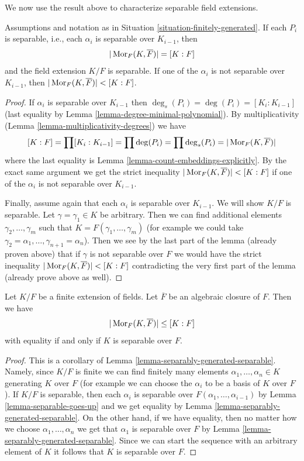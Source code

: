\noindent
We now use the result above to characterize separable field extensions.

\begin{lemma}
\label{lemma-separably-generated-separable}
Assumptions and notation as in Situation \ref{situation-finitely-generated}.
If each $P_i$ is separable, i.e., each $\alpha_i$ is separable over
$K_{i - 1}$, then
$$
|\mathop{\mathrm{Mor}}\nolimits_F(K, \overline{F})| = [K : F]
$$
and the field extension $K/F$ is separable. If one of the $\alpha_i$ is
not separable over $K_{i - 1}$, then
$|\mathop{\mathrm{Mor}}\nolimits_F(K, \overline{F})| < [K : F]$.
\end{lemma}

\begin{proof}
If $\alpha_i$ is separable over $K_{i - 1}$ then
$\deg_s(P_i) = \deg(P_i) = [K_i : K_{i - 1}]$
(last equality by Lemma \ref{lemma-degree-minimal-polynomial}).
By multiplicativity (Lemma \ref{lemma-multiplicativity-degrees}) we have
$$
[K : F] = \prod [K_i : K_{i - 1}] = \prod \deg(P_i) =
\prod \deg_s(P_i) = |\mathop{\mathrm{Mor}}\nolimits_F(K, \overline{F})|
$$
where the last equality is Lemma \ref{lemma-count-embeddings-explicitly}.
By the exact same argument we get the strict inequality
$|\mathop{\mathrm{Mor}}\nolimits_F(K, \overline{F})| < [K : F]$ if one of the $\alpha_i$ is
not separable over $K_{i - 1}$.

\medskip\noindent
Finally, assume again that each $\alpha_i$ is separable over $K_{i - 1}$.
We will show $K/F$ is separable.
Let $\gamma = \gamma_1 \in K$ be arbitrary. Then we can find additional
elements $\gamma_2, \ldots, \gamma_m$ such that
$K = F(\gamma_1, \ldots, \gamma_m)$ (for example we could take
$\gamma_2 = \alpha_1, \ldots, \gamma_{n + 1} = \alpha_n$).
Then we see by the last part of the lemma (already proven above)
that if $\gamma$ is not separable over $F$ we would have the
strict inequality $|\mathop{\mathrm{Mor}}\nolimits_F(K, \overline{F})| < [K : F]$
contradicting the very first part of the lemma (already prove above
as well).
\end{proof}

\begin{lemma}
\label{lemma-separable-equality}
Let $K/F$ be a finite extension of fields. Let $\overline{F}$ be an
algebraic closure of $F$. Then we have
$$
|\mathop{\mathrm{Mor}}\nolimits_F(K, \overline{F})| \leq [K : F]
$$
with equality if and only if $K$ is separable over $F$.
\end{lemma}

\begin{proof}
This is a corollary of Lemma \ref{lemma-separably-generated-separable}.
Namely, since $K/F$ is finite we can find finitely many elements
$\alpha_1, \ldots, \alpha_n \in K$ generating $K$ over $F$ (for example
we can choose the $\alpha_i$ to be a basis of $K$ over $F$).
If $K/F$ is separable, then each $\alpha_i$ is separable over
$F(\alpha_1, \ldots, \alpha_{i - 1})$ by Lemma \ref{lemma-separable-goes-up}
and we get equality by Lemma \ref{lemma-separably-generated-separable}.
On the other hand, if we have equality, then no matter how we choose
$\alpha_1, \ldots, \alpha_n$ we get that $\alpha_1$ is separable over
$F$ by Lemma \ref{lemma-separably-generated-separable}. Since we
can start the sequence with an arbitrary element of $K$ it follows
that $K$ is separable over $F$.
\end{proof}

